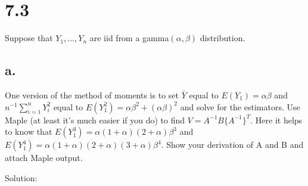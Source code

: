 \documentclass[
  letterpaper,
  DIV=11,
  numbers=noendperiod]{scrreprt}
\begin{document}
\hypertarget{section-44}{%
\section{7.3}\label{section-44}}

Suppose that \(Y_1, \dots , Y_n\) are iid from a
gamma\((\alpha, \beta)\) distribution.

\hypertarget{a.-7}{%
\subsection{a.}\label{a.-7}}

One version of the method of moments is to set \(\bar Y\) equal to
\(E(Y_1) = \alpha \beta\) and \(n^{-1} \sum_{i=1}^n Y_i^2\) equal to
\(E(Y_1^2) = \alpha \beta^2 + (\alpha \beta)^2\) and solve for the
estimators. Use Maple (at least it's much easier if you do) to find
\(V= A^{-1} B \{A^{-1}\}^T\). Here it helps to know that
\(E(Y_1^3) = \alpha(1+\alpha )(2+\alpha ) \beta^3\) and
\(E(Y_1^4) = \alpha(1+\alpha)(2+\alpha)(3+\alpha)\beta^4\). Show your
derivation of A and B and attach Maple output.

Solution:
\end{document}
